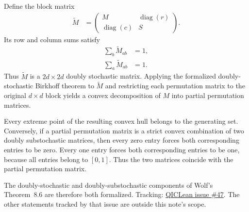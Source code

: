 \documentclass{article}
\begin{document}
Define the block matrix
\begin{align}
    \widetilde M
        &=
        \begin{pmatrix}
            M&\operatorname{diag}(r)\\
            \operatorname{diag}(c)&S
        \end{pmatrix}.
    \label{eq:wolf_ch8_birkhoff_doubly_substochastic_gap_doubly_stochastic_completion}
\end{align}
Its row and column sums satisfy
\begin{align}
    \sum_b\widetilde M_{ab}
        &=1,
    \label{eq:wolf_ch8_birkhoff_doubly_substochastic_gap_completed_row_sums}\\
    \sum_a\widetilde M_{ab}
        &=1.
    \label{eq:wolf_ch8_birkhoff_doubly_substochastic_gap_completed_column_sums}
\end{align}
Thus $\widetilde M$ is a $2d\times2d$ doubly stochastic matrix. Applying the
formalized doubly-stochastic Birkhoff theorem to $\widetilde M$ and restricting
each permutation matrix to the original $d\times d$ block yields a convex
decomposition of $M$ into partial permutation matrices.

Every extreme point of the resulting convex hull belongs to the generating
set. Conversely, if a partial permutation matrix is a strict convex
combination of two doubly substochastic matrices, then every zero entry
forces both corresponding entries to be zero. Every one entry forces both
corresponding entries to be one, because all entries belong to $[0,1]$.
Thus the two matrices coincide with the partial permutation matrix.

The doubly-stochastic and doubly-substochastic components of Wolf's
Theorem~8.6 \cite{Wolf2012Quantum} are therefore both formalized.
Tracking: \href{https://github.com/LionSR/QICLean/issues/47}{QICLean issue \#47}.
The other statements tracked by that issue are outside this note's scope.



\end{document}
